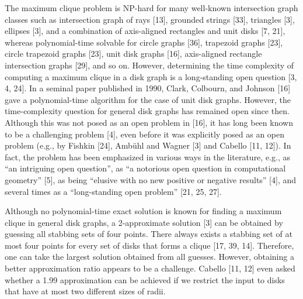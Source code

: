\documentclass[10pt,a4paper]{amsart}
\begin{document}
The maximum clique problem is NP-hard for many well-known intersection graph classes such as intersection graph of rays [13], grounded strings [33], triangles [3], ellipses [3], and a combination of axis-aligned rectangles and unit disks [7, 21], whereas polynomial-time solvable for circle graphs [36], trapezoid graphs [23], circle trapezoid graphs [23], unit disk graphs [16], axis-aligned rectangle intersection graphs [29], and so on. However, determining the time complexity of computing a maximum clique in a disk graph is a long-standing open question [3, 4, 24]. In a seminal paper published in 1990, Clark, Colbourn, and Johnson [16] gave a polynomial-time algorithm for the case of unit disk graphs. However, the time-complexity question for general disk graphs has remained open since then. Although this was not posed as an open problem in [16], it has long been known to be a challenging problem [4], even before it was explicitly posed as an open problem (e.g., by Fishkin [24], Ambühl and Wagner [3] and Cabello [11, 12]). In fact, the problem has been emphasized in various ways in the literature, e.g., as “an intriguing open question”, as “a notorious open question in computational geometry” [5], as being “elusive with no new positive or negative results” [4], and several times as a “long-standing open problem” [21, 25, 27].
\par
\par
Although no polynomial-time exact solution is known for finding a maximum clique in general disk graphs, a 2-approximate solution [3] can be obtained by guessing all stabbing sets of four points. There always exists a stabbing set of at most four points for every set of disks that forms a clique [17, 39, 14]. Therefore, one can take the largest solution obtained from all guesses. However, obtaining a better approximation ratio appears to be a challenge. Cabello [11, 12] even asked whether a 1.99 approximation can be achieved if we restrict the input to disks that have at most two different sizes of radii.
\par
\par
\end{document}
